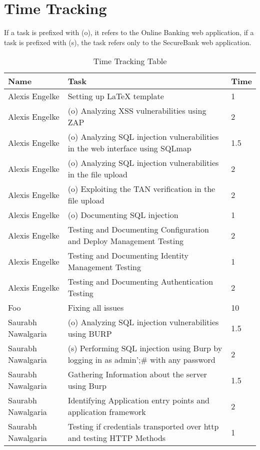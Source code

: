 \chapter{Time Tracking}\label{chapter:times}

If a task is prefixed with (o), it refers to the Online Banking web application, if a task is prefixed with (s), the task refers only to the SecureBank web application.

\begin{table}[htpb]
  \caption[Time Tracking Table]{Time Tracking Table}\label{tab:times}
  \centering
  \begin{tabular}{l p{8cm} l}
    \toprule
      Name & Task & Time \\
    \midrule
      Alexis Engelke & Setting up LaTeX template & 1 \\
      Alexis Engelke & (o) Analyzing XSS vulnerabilities using ZAP & 2 \\
      Alexis Engelke & (o) Analyzing SQL injection vulnerabilities in the web interface using SQLmap & 1.5 \\
      Alexis Engelke & (o) Analyzing SQL injection vulnerabilities in the file upload & 2 \\
      Alexis Engelke & (o) Exploiting the TAN verification in the file upload & 2 \\
      Alexis Engelke & (o) Documenting SQL injection & 1 \\
      Alexis Engelke & Testing and Documenting Configuration and Deploy Management Testing & 2 \\
      Alexis Engelke & Testing and Documenting Identity Management Testing & 1 \\
      Alexis Engelke & Testing and Documenting Authentication Testing & 2 \\
      Foo & Fixing all issues & 10 \\
      Saurabh Nawalgaria & (o) Analyzing SQL injection vulnerabilities using BURP & 1.5 \\
      Saurabh Nawalgaria & (s) Performing SQL injection using Burp by logging in as admin';# with any password & 2 \\
      Saurabh Nawalgaria & Gathering Information about the server using Burp & 1.5 \\
      Saurabh Nawalgaria & Identifying Application entry points and application framework & 2 \\
      Saurabh Nawalgaria & Testing if credentials transported over http and testing HTTP Methods & 1 \\

\end{tabular}
\end{table}
